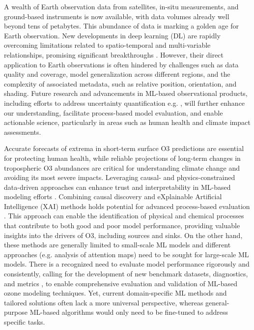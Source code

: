 \documentclass[gmd, manuscript]{copernicus}
\begin{document}
A wealth of Earth observation data from satellites, in-situ measurements, and ground-based instruments is now available, with data volumes already well beyond tens of petabytes. This abundance of data is marking a golden age for Earth observation. New developments in deep learning (DL) are rapidly overcoming limitations related to spatio-temporal and multi-variable relationships, promising significant breakthroughs \citep{Eyring2024}. However, their direct application to Earth observations is often hindered by challenges such as data quality and coverage, model generalization across different regions, and the complexity of associated metadata, such as relative position, orientation, and shading. Future research and advancements in ML-based observational products, including efforts to address uncertainty quantification e.g. \citep{Haynes2023}, will further enhance our understanding, facilitate process-based model evaluation\citep{Nowack2020}, and enable actionable science, particularly in areas such as human health \citep{Fleming2018} and climate impact \citep{Gaudel2018} assessments.

Accurate forecasts of extrema in short-term surface O3 predictions are essential for protecting human health, while reliable projections of long-term changes in tropospheric O3 abundances are critical for understanding climate change and avoiding its most severe impacts. Leveraging causal- and physics-constrained data-driven approaches can enhance trust and interpretability in ML-based modeling efforts \citep{Tesch2023,Beucler2024}. Combining causal discovery and eXplainable Artificial Intelligence (XAI) methods holds potential for advanced process-based evaluation \citep{IglesiasSuarez2024}. This approach can enable the identification of physical and chemical processes that contribute to both good and poor model performance, providing valuable insights into the drivers of O3, including sources and sinks. On the other hand, these methods are generally limited to small-scale ML models and different approaches (e.g. analysis of attention maps) need to be sought for large-scale ML models. There is a recognized need to evaluate model performance rigorously and consistently, calling for the development of new benchmark datasets, diagnostics, and metrics \citep{Betancourt2021, betancourt_global_2022}, to enable comprehensive evaluation and validation of ML-based ozone modeling techniques. Yet, current domain-specific ML methods and tailored solutions often lack a more universal perspective, whereas general-purpose ML-based algorithms would only need to be fine-tuned to address specific tasks. 
\end{document}
